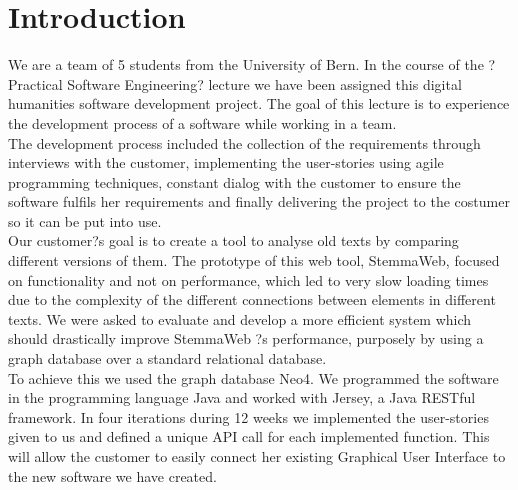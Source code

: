 \documentclass[11pt,fleqn,openany]{book} %
\begin{document}


\chapter{Introduction}

We are a team of 5 students from the University of Bern. In the course of the ?Practical Software Engineering? lecture we have been assigned this digital humanities software development project. The goal of this lecture is to experience the development process of a software while working in a team. \\
The development process included the collection of the requirements through interviews with the customer, implementing the user-stories using agile programming techniques, constant dialog with the customer to ensure the software fulfils her requirements and finally delivering the project to the costumer so it can be put into use. \\
Our customer?s goal is to create a tool to analyse old texts by comparing different versions of them. The prototype of this web tool, StemmaWeb, focused on functionality and not on performance, which led to very slow loading times due to the complexity of the different connections between elements in different texts. We were asked to evaluate and develop a more efficient system which should drastically improve StemmaWeb ?s performance,  purposely by using a graph database over a standard relational database. \\
To achieve this we used the graph database Neo4. We programmed the software in the programming language Java and worked with Jersey, a Java RESTful framework. In four iterations during 12 weeks we implemented the user-stories given to us and defined a unique API call for each implemented function. This will allow the customer to easily connect her existing Graphical User Interface to the new software we have created.\\


\end{document}
